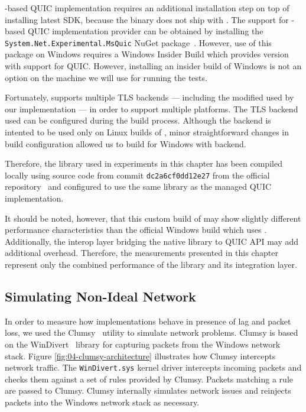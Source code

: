 \libmsquic{}-based QUIC implementation requires an additional installation step on top of installing
latest \dotnet{} SDK, because the \libmsquic{} binary does not ship with \dotnet{}. The support for
\libmsquic{}-based QUIC implementation provider can be obtained by installing the
\texttt{System.Net.Experimental.MsQuic} NuGet package~\cite{SystemNetQuicExperimentalMsquic}.
However, use of this package on Windows requires a Windows Insider Build which provides
\libschannel{} version with support for QUIC\@. However, installing an insider build of Windows is
not an option on the machine we will use for running the tests.

Fortunately, \libmsquic{} supports multiple TLS backends --- including the modified \libopenssl{} used
by our implementation --- in order to support multiple platforms. The TLS backend used can be
configured during the build process. Although the \libopenssl{} backend is intented to be used only
on Linux builds of \libmsquic{}, minor straightforward changes in build configuration allowed us to
build \libmsquic{} for Windows with \libopenssl{} backend.

Therefore, the \libmsquic{} library used in experiments in this chapter has been compiled locally
using source code from commit \texttt{dc2a6cf0dd12e27} from the official \libmsquic{}
repository~\cite{msquicGithub} and configured to use the same \libopenssl{} library as the managed
QUIC implementation.

It should be noted, however, that this custom build of \libmsquic{} may show slightly different
performance characteristics than the official Windows build which uses \libschannel{}. Additionally,
the interop layer bridging the native library to \dotnet{} QUIC API may add additional overhead.
Therefore, the measurements presented in this chapter represent only the combined performance of the
library and its \dotnet{} integration layer.

\subsection{Simulating Non-Ideal Network}

In order to measure how implementations behave in presence of lag and packet loss, we used the
Clumsy~\cite{clumsy} utility to simulate network problems. Clumsy is based on the
WinDivert~\cite{WinDivert} library for capturing packets from the Windows network stack. Figure
\autoref{fig:04-clumsy-architecture} illustrates how Clumsy intercepts network traffic. The
\texttt{WinDivert.sys} kernel driver intercepts incoming packets and checks them against a set of
rules provided by Clumsy. Packets matching a rule are passed to Clumsy. Clumsy internally simulates
network issues and reinjects packets into the Windows network stack as necessary.

